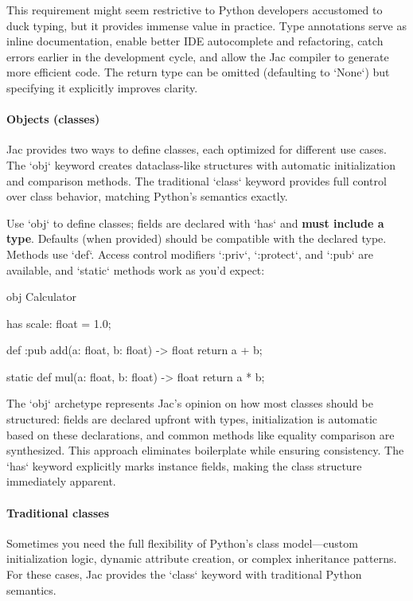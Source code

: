 This requirement might seem restrictive to Python developers accustomed to duck typing, but it provides immense value in practice. Type annotations serve as inline documentation, enable better IDE autocomplete and refactoring, catch errors earlier in the development cycle, and allow the Jac compiler to generate more efficient code. The return type can be omitted (defaulting to `None`) but specifying it explicitly improves clarity.

\paragraph{Objects (classes)}

Jac provides two ways to define classes, each optimized for different use cases. The `obj` keyword creates dataclass-like structures with automatic initialization and comparison methods. The traditional `class` keyword provides full control over class behavior, matching Python's semantics exactly.

Use `obj` to define classes; fields are declared with `has` and \textbf{must include a type}. Defaults (when provided) should be compatible with the declared type. Methods use `def`. Access control modifiers `:priv`, `:protect`, and `:pub` are available, and `static` methods work as you'd expect:

\begin{jacblock}
obj Calculator {
    has scale: float = 1.0;

    def :pub add(a: float, b: float) -> float {
        return a + b;
    }

    static def mul(a: float, b: float) -> float {
        return a * b;
    }
}
\end{jacblock}

The `obj` archetype represents Jac's opinion on how most classes should be structured: fields are declared upfront with types, initialization is automatic based on these declarations, and common methods like equality comparison are synthesized. This approach eliminates boilerplate while ensuring consistency. The `has` keyword explicitly marks instance fields, making the class structure immediately apparent.

\paragraph{Traditional classes}

Sometimes you need the full flexibility of Python's class model—custom initialization logic, dynamic attribute creation, or complex inheritance patterns. For these cases, Jac provides the `class` keyword with traditional Python semantics.

